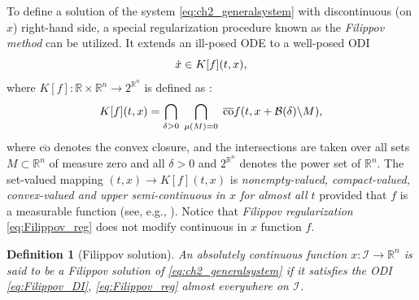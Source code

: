 \documentclass{article}
\newcommand{\R}{\mathbb{R}}
\newcommand{\co}{\mathrm{co}}
\newtheorem{definition}{Definition}
\begin{document}
To define a solution of the system \eqref{eq:ch2_generalsystem} with discontinuous (on $x$) right-hand side, a special regularization procedure known as the \textit{Filippov method} \cite{Filippov1988:Book} can be utilized. It extends  an ill-posed ODE to a well-posed ODI\vspace{-1mm}
\begin{equation}\label{eq:Filippov_DI}
	\dot x \in K[f](t,x),\vspace{-1mm}
\end{equation}
where $K[f]:\R\times \R^n\to 2^{\R^n}$ is defined as \cite[page 85]{Filippov1988:Book}:\vspace{-1mm}
	\begin{equation}\label{eq:Filippov_reg}
		K[f](t,x)=\bigcap_{\delta>0}\; \bigcap_{\mu(M)=0}  \;\overline{\co} f(t,x+\mathcal{B}(\delta)\backslash M),\vspace{-2mm}
	\end{equation}
	where $\overline{\co}$ denotes the convex closure, and the intersections 
	are taken over all sets $M\subset\R^n$ of measure zero and all 
	$\delta>0$  and $2^{\R^n}$ denotes the power set of $\R^n$.  The set-valued mapping $(t,x)\to K[f](t,x)$ is \textit{nonempty-valued, compact-valued, convex-valued and upper semi-continuous in $x$ for almost all $t$ }provided that $f$ is a measurable function (see, e.g., \cite{Filippov1988:Book}). Notice that \textit{Filippov regularization} \eqref{eq:Filippov_reg} does not modify continuous in $x$ function $f$.

	
	\begin{definition}[\small Filippov solution]\label{def:Filippov}
		\itshape An absolutely continuous function $x : \mathcal{I}\to\R^n$  is said to be
		a {Filippov solution} of \eqref{eq:ch2_generalsystem} if
 it satisfies the ODI \eqref{eq:Filippov_DI}, \eqref{eq:Filippov_reg}
		almost everywhere on $\mathcal{I}$.
	\end{definition}
\end{document}
